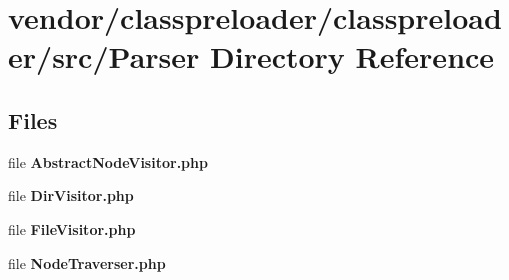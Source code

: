 \section{vendor/classpreloader/classpreloader/src/\+Parser Directory Reference}
\label{dir_5c4700719df4db32d5425cafd2ee5e36}
\subsection*{Files}
\begin{DoxyCompactItemize}
\item 
file {\bf Abstract\+Node\+Visitor.\+php}
\item 
file {\bf Dir\+Visitor.\+php}
\item 
file {\bf File\+Visitor.\+php}
\item 
file {\bf Node\+Traverser.\+php}
\end{DoxyCompactItemize}
